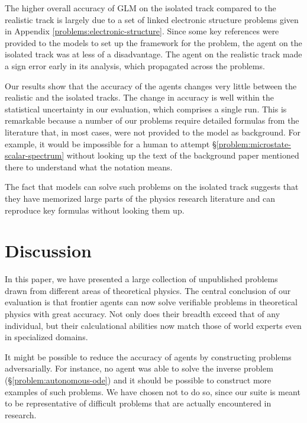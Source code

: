 \documentclass[aps,prd,reprint,superscriptaddress,nofootinbib]{revtex4-2}
\newcommand{\problemsymbol}{\S}
\DeclareRobustCommand{\problemref}[1]{\hyperref[#1]{\mbox{\problemsymbol\ref*{#1}}}}
\begin{document}
The higher overall accuracy of GLM on the isolated track compared to the realistic track is largely due to a set of linked electronic structure problems given in Appendix \ref{problems:electronic-structure}. Since some key references were provided to the models to set up the framework for the problem, the agent on the isolated track was at less of a disadvantage.  The agent on the realistic track made a sign error early in its analysis, which propagated across the problems.

Our results show that the accuracy of the agents  changes very little between the realistic and the isolated tracks. The change in accuracy is well within the statistical uncertainty in our evaluation, which comprises a single run. This is remarkable because a number of our problems require detailed formulas from the literature that, in most cases,  were not provided to the model as background. For example, it would be impossible for a human to attempt \problemref{problem:microstate-scalar-spectrum} without looking up the text of the background paper mentioned there \cite{Bena:2016ypk} to understand what the notation means.  

The fact that models can solve such problems on the isolated track suggests that they have memorized large parts of the physics research literature and can reproduce key formulas without looking them up.








\section{Discussion \label{secdiscussion}}
In this paper, we have presented a large collection of unpublished problems drawn from different areas of theoretical physics. The central conclusion of our evaluation is that frontier agents can now solve verifiable problems in theoretical physics with great accuracy. Not only does their breadth exceed that of any individual, but their calculational abilities now match those of world experts even in specialized domains. 
 
It might be possible to reduce the accuracy of agents by constructing problems adversarially. For instance, no agent was able to solve the inverse problem (\problemref{problem:autonomous-ode}) and it should be possible to construct more examples of such problems. We have chosen not to do so, since our suite is meant to be representative of difficult problems that are actually encountered in research.
\end{document}
